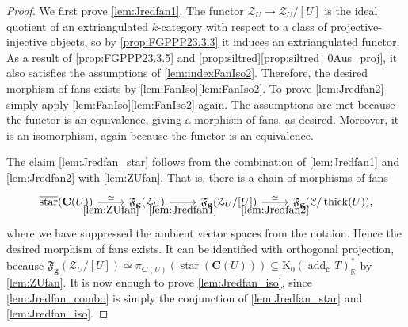 \documentclass[10pt,twoside, a4paper,reqno]{amsart}
\DeclareMathOperator{\add}{add}
\DeclareMathOperator{\thick}{thick}
\DeclareMathOperator{\starr}{star}
\newcommand{\partfan}[1]{\mathfrak{F}_{\bfg}(#1)}
\newcommand{\R}{\mathbb{R}}
\newcommand{\calC}{\mathcal{C}}
\newcommand{\calZ}{\mathcal{Z}}
\newcommand{\boldC}{\mathbf{C}}
\newcommand{\K}{\mathrm{K}}
\newcommand{\bfg}{\mathbf{g}}
\theoremstyle{definition}
\begin{document}
\begin{proof}
    We first prove \eqref{lem:Jredfan1}. 
    The functor $\calZ_U \to \calZ_U/[U]$ is the ideal quotient of an extriangulated $k$-category with respect to a class of projective-injective objects, so by \eqref{prop:FGPPP23.3.3} it induces an extriangulated functor. As a result of \eqref{prop:FGPPP23.3.5} and \cref{prop:siltred}\eqref{prop:siltred_0Aus_proj}, it also satisfies the assumptions of \cref{lem:indexFanIso2}. Therefore, the desired morphism of fans exists by \cref{lem:FanIso}\eqref{lem:FanIso2}. 
    To prove \eqref{lem:Jredfan2} simply apply \cref{lem:FanIso}\eqref{lem:FanIso2} again. The assumptions are met because the functor is an equivalence, giving a morphism of fans, as desired. Moreover, it is an isomorphism, again because the functor is an equivalence.

    The claim \eqref{lem:Jredfan_star} follows from the combination of \eqref{lem:Jredfan1} and \eqref{lem:Jredfan2} with \cref{lem:ZUfan}. That is, there is a chain of morphisms of fans
    \[ \begin{tikzcd}
        \overline{\starr}(\boldC(U)) \arrow[r, "\simeq", "\ref{lem:ZUfan}"'] & \partfan{\calZ_U} \arrow[r, "\eqref{lem:Jredfan1}"'] & \partfan{\calZ_U/[U]} \arrow[r, "\eqref{lem:Jredfan2}"', "{\simeq}"] & \partfan{\calC/\thick(U)}{,}
    \end{tikzcd}\]
    where we have suppressed the ambient vector spaces from the notaion. Hence the desired morphism of fans exists. It can be identified with orthogonal projection, because $\partfan{\calZ_U/[U]} \simeq \pi_{\boldC(U)}(\starr(\boldC(U))) \subseteq \K_0(\add_{\calC}T)_\R^*$ by \cref{lem:ZUfan}.
    It is now enough to prove \eqref{lem:Jredfan_iso}, since \eqref{lem:Jredfan_combo} is simply the conjunction of  {\eqref{lem:Jredfan_star} and \eqref{lem:Jredfan_iso}}.


\end{proof}
\end{document}
